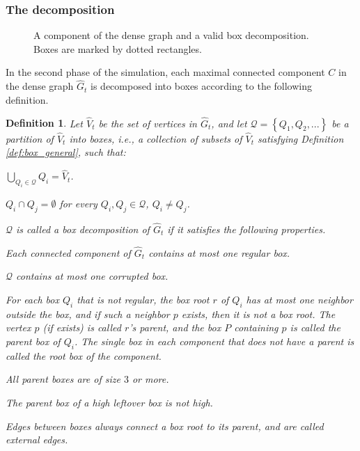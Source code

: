 \documentclass[11pt]{article}
\def\dnsitem{\vspace{-7pt}\item}
\newtheorem{definition}[theorem]{Definition}
\theoremstyle{definition}
\def\decomponereg{\mathcal{A}_1}
\def\decomponecorr{\mathcal{A}_2}
\def\decomproot{\mathcal{A}_3}
\def\decompsize{\mathcal{A}_4}
\def\decompcleanl{\mathcal{A}_5}
\def\decompedges{\mathcal{A}_6}
\begin{document}
\subsubsection{The decomposition}

\begin{figure}[thbp]
  \caption{\sf A component of the dense graph and a valid box decomposition. Boxes are marked by dotted rectangles.}
  \medskip
  \centering
  \label{fig:box_decomp}
\end{figure}

In the second phase of the simulation, each maximal connected component $C$ in the dense graph $\hat{G}_t$ is decomposed into boxes according to the following definition.
\begin{definition}
\label{def:box_decomp}
Let $\hat{V}_t$ be the set of vertices in $\hat{G}_t$, and let $\mathcal{Q} = \left\{Q_1, Q_2, ...\right\}$ be a partition of $\hat{V}_t$ into boxes, i.e., a collection of subsets of $\hat{V}_t$ satisfying Definition \ref{def:box_general}, such that:
\begin{enumerate}[(a)]
	{\setlength\itemindent{10pt} \dnsitem $\bigcup_{Q_i \in \mathcal{Q}}{Q_i} = \hat{V}_t$.}
	{\setlength\itemindent{10pt} \dnsitem $Q_i \cap Q_j = \emptyset$ for every $Q_i, Q_j \in \mathcal{Q}$, $Q_i \neq Q_j$.}
\end{enumerate}
$\mathcal{Q}$ is called a \emph{box decomposition} of $\hat{G}_t$ if it satisfies the following properties.
\begin{description}
	\dnsitem[$\decomponereg$.] Each connected component of $\hat{G}_t$ contains at most one regular box.
	\dnsitem[$\decomponecorr$.] $\mathcal{Q}$ contains at most one corrupted box.
	\dnsitem[$\decomproot$.] For each box $Q_i$ that is not regular, the box root $r$ of $Q_i$ has at most one neighbor outside the box, and if such a neighbor $p$ exists, then it is not a box root.
	The vertex $p$ (if exists) is called $r$'s \emph{parent}, and the box $P$ containing $p$ is called the \emph{parent box} of $Q_i$. 
	The single box in each component that does not have a parent is called the \emph{root box} of the component.
	\dnsitem[$\decompsize$.] All parent boxes are of size $3$ or more. 
	\dnsitem[$\decompcleanl$.] The parent box of a high leftover box is not high.
	\dnsitem[$\decompedges$.] Edges between boxes always connect a box root to its parent, and are called \emph{external edges}.  
\end{description}

\end{definition}
\end{document}
